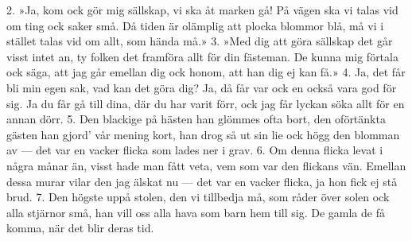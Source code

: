 2.  »Ja, kom ock gör mig sällskap, vi ska åt marken gå!
    På vägen ska vi talas vid om ting ock saker små.
    Då tiden är olämplig att plocka blommor blå,
    må vi i stället talas vid om allt, som hända må.»
3.  »Med dig att göra sällskap det går visst intet an,
    ty folken det framföra allt för din fästeman.
    De kunna mig förtala ock säga, att jag går
    emellan dig ock honom, att han dig ej kan få.»
4.  Ja, det får bli min egen sak, vad kan det göra dig?
    Ja, då får var ock en också vara god för sig.
    Ja du får gå till dina, där du har varit förr,
    ock jag får lyckan söka allt för en annan dörr.
5.  Den blackige på hästen han glömmes ofta bort,
    den oförtänkta gästen han gjord’ vår mening kort,
    han drog så ut sin lie ock högg den blomman av —
    det var en vacker flicka som lades ner i grav.
6.  Om denna flicka levat i några månar än,
    visst hade man fått veta, vem som var den flickans vän.
    Emellan dessa murar vilar den jag älskat nu —
    det var en vacker flicka, ja hon fick ej stå brud.
7.  Den högste uppå stolen, den vi tillbedja må,
    som råder över solen ock alla stjärnor små,
    han vill oss alla hava som barn hem till sig.
    De gamla de få komma, när det blir deras tid.
